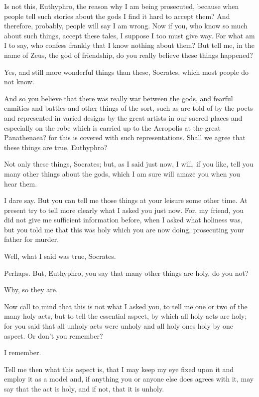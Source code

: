 \documentclass[letterpaper,12pt]{article}
\newcommand{\stephpag}[1]{\marginnote{\small\itshape\fontfamily{ppl}\selectfont #1}}
\begin{document}
\begin{drama}
\socratesspeaks
Is not this, Euthyphro, the reason why I am being prosecuted, because when people tell such stories about the gods I find it hard to accept them? And therefore, probably, people will say I am wrong. Now if you, who know so much about such things, \stephpag{b} accept these tales, I suppose I too must give way. For what am I to say, who confess frankly that I know nothing about them? But tell me, in the name of Zeus, the god of friendship, do you really believe these things happened?

\euthyphrospeaks
Yes, and still more wonderful things than these, Socrates, which most people do not know.

\socratesspeaks
And so you believe that there was really war between the gods, and fearful enmities and battles and other things of the sort, such as are told of by the poets and represented in varied designs \stephpag{c} by the great artists in our sacred places and especially on the robe which is carried up to the Acropolis at the great Panathenaea? for this is covered with such representations. Shall we agree that these things are true, Euthyphro?

\euthyphrospeaks
Not only these things, Socrates; but, as I said just now, I will, if you like, tell you many other things about the gods, which I am sure will amaze you when you hear them.

\socratesspeaks
I dare say. But you can tell me those things at your leisure some other time. At present try to tell more clearly what I asked you just now. \stephpag{d} For, my friend, you did not give me sufficient information before, when I asked what holiness was, but you told me that this was holy which you are now doing, prosecuting your father for murder.

\euthyphrospeaks
Well, what I said was true, Socrates.

\socratesspeaks
Perhaps. But, Euthyphro, you say that many other things are holy, do you not?

\euthyphrospeaks
Why, so they are.

\socratesspeaks
Now call to mind that this is not what I asked you, to tell me one or two of the many holy acts, but to tell the essential aspect, by which all holy acts are holy; for you said \stephpag{e} that all unholy acts were unholy and all holy ones holy by one aspect. Or don't you remember?

\euthyphrospeaks
I remember.

\socratesspeaks
Tell me then what this aspect is, that I may keep my eye fixed upon it and employ it as a model and, if anything you or anyone else does agrees with it, may say that the act is holy, and if not, that it is unholy.


\end{drama}
\end{document}
